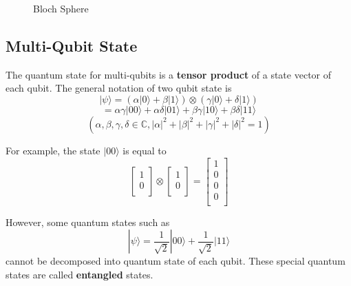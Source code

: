 \begin{figure}[ht]
\centering
{}
 \caption{Bloch Sphere}
 \end{figure}
	
 \subsection{Multi-Qubit State}
  The quantum state for multi-qubits is a \textbf{tensor product} of a state vector of each qubit.  The general notation of two qubit state is
   $$ |\psi\rangle = (\alpha |0\rangle + \beta |1\rangle) \otimes  (\gamma |0\rangle + \delta |1\rangle) $$
   $$ = \alpha \gamma |00\rangle + \alpha \delta |01\rangle + \beta \gamma |10\rangle + \beta \delta |11\rangle $$
  $$(\alpha, \beta, \gamma, \delta \in \mathbb{C}, |\alpha|^2+|\beta|^2+|\gamma|^2+|\delta|^2=1)$$
  
  For example, the state $|00\rangle$ is equal to 
  $$  \left[
\begin{array}{c}
1 \\
0 \\
\end{array}
\right]
\otimes
 \left[
\begin{array}{c}
1 \\
0 \\
\end{array}
\right]
= \left[
\begin{array}{c}
1 \\
0 \\
0 \\
0 \\
\end{array}
\right]$$

 However, some quantum states such as
 $$ |\psi\rangle = \frac{1}{\sqrt{2}}|00\rangle + \frac{1}{\sqrt{2}}|11\rangle$$ cannot be decomposed into quantum state of each qubit.  These special quantum states are called \textbf{entangled} states.

